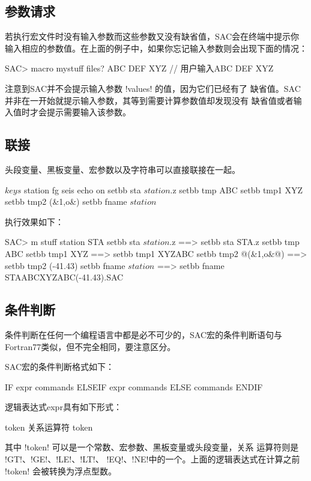 \subsection{参数请求}
若执行宏文件时没有输入参数而这些参数又没有缺省值，SAC会在终端中提示你
输入相应的参数值。在上面的例子中，如果你忘记输入参数则会出现下面的情况：
\begin{SACCode}
SAC> macro mystuff
files? ABC DEF XYZ          // 用户输入ABC DEF XYZ
\end{SACCode}
注意到SAC并不会提示输入参数 !values! 的值，因为它们已经有了
缺省值。SAC并非在一开始就提示输入参数，其等到需要计算参数值却发现没有
缺省值或者输入值时才会提示需要输入该参数。

\subsection{联接}
头段变量、黑板变量、宏参数以及字符串可以直接联接在一起。

\begin{SACCode}
$keys$ station
fg seis
echo on
setbb sta $station$.z
setbb tmp ABC
setbb tmp1 XYZ%
setbb tmp2 (&1,o&)
setbb fname $station$%
\end{SACCode}

执行效果如下：
\begin{SACCode}
SAC> m stuff station STA
 setbb sta $station$.z
 ==>  setbb sta STA.z
 setbb tmp ABC
 setbb tmp1 XYZ%
 ==>  setbb tmp1 XYZABC
 setbb tmp2 @(&1,o&@)
 ==>  setbb tmp2 (-41.43)
 setbb fname $station$%
 ==>  setbb fname STAABCXYZABC(-41.43).SAC
\end{SACCode}

\subsection{条件判断}
条件判断在任何一个编程语言中都是必不可少的，SAC宏的条件判断语句与
Fortran77类似，但不完全相同，要注意区分。

SAC宏的条件判断格式如下：
\begin{SACCode}
  IF expr
  	commands
  ELSEIF expr
  	commands
  ELSE
  	commands
  ENDIF
\end{SACCode}

逻辑表达式expr具有如下形式：
\begin{SACCode}
    token 关系运算符 token
\end{SACCode}
其中 !token! 可以是一个常数、宏参数、黑板变量或头段变量，关系
运算符则是 !GT!、!GE!、!LE!、!LT!、
!EQ!、!NE!中的一个。上面的逻辑表达式在计算之前 !token!
会被转换为浮点型数。


